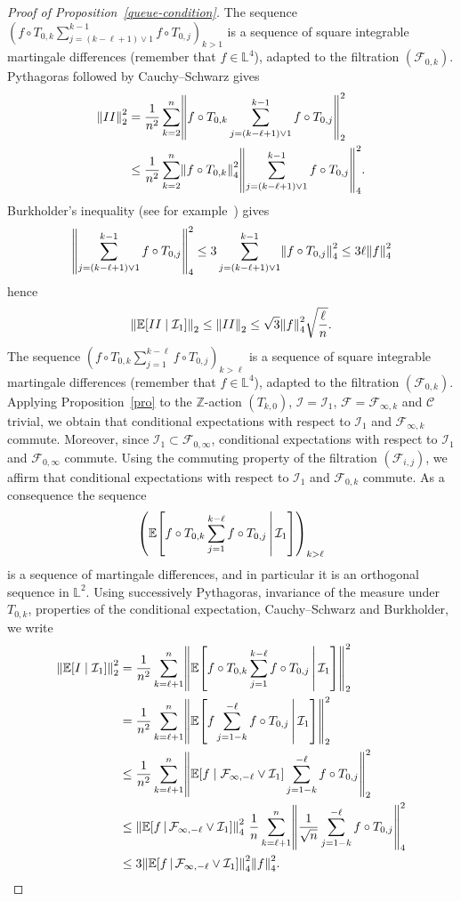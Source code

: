 \documentclass[AHL,Unicode,longabstracts,published]{cedram}
\newcommand{\Z}{\mathbb{Z}}
\newcommand*\bbL{\mathbb{L}}
\newcommand{\bbE}{\mathbb{E}}
\newcommand{\E}[1]{\bbE\left[#1\right]}
\newcommand*\I{\mathcal{I}}
\newcommand*\C{\mathcal{C}}
\newcommand*\F{\mathcal{F}}
\newcommand{\norm}[1]{\left\lVert #1\right\rVert}
\let\originalleft\left
\let\originalright\right
\renewcommand{\left}{\mathopen{}\mathclose\bgroup\originalleft}
\renewcommand{\right}{\aftergroup\egroup\originalright}
\begin{document}
\begin{proof}[Proof of Proposition~\ref{queue-condition}]
The sequence $(f \circ T_{0,k} \sum_{j=(k-\ell+1)\vee 1}^{k-1} f\circ T_{0,j})_{k>1}$ is a sequence of square integrable martingale differences (remember that $f\in \bbL^4$), adapted to the filtration $(\F_{0,k})$. Pythagoras followed by Cauchy--Schwarz gives
\begin{align*}
\norm{II}_2^2&= \frac1{n^2} \sum_{k=2}^{n} \norm{ f \circ T_{0,k}
\sum_{j=(k-\ell+1)\vee 1}^{k-1} f \circ T_{0,j}}_2^2\\
&\leq \frac1{n^2} \sum_{k=2}^{n}
\norm{f\circ T_{0,k}}_4^2\norm{\sum_{j=(k-\ell+1)\vee 1}^{k-1} f \circ T_{0,j}}_4^2.
\end{align*}
Burkholder's inequality (see for example~\cite{MR2472010}) gives
\[
\norm{\sum_{j=(k-\ell+1)\vee 1}^{k-1} f \circ T_{0,j}}_4^2\leq3\sum_{j=(k-\ell+1)\vee 1}^{k-1}\norm{f\circ T_{0,j}}_4^2\leq 3\ell\norm{f}_4^2
\]
hence
\begin{equation}\label{eq:controle_norme_II}
\norm{\E{II\mid\I_1}}_2\leq\norm{II}_2\leq \sqrt{3}\norm{f}_4^2\sqrt{\frac{\ell}{n}}.
\end{equation}
The sequence $(f \circ T_{0,k}
\sum_{j=1}^{k-\ell} f \circ T_{0,j})_{k>\ell}$ is a sequence of square integrable martingale differences (remember that $f\in \bbL^4$), adapted to the filtration $(\F_{0,k})$. Applying Proposition~\ref{pro} to the $\Z$-action $(T_{k,0})$, $\I=\I_1$, $\F=\F_{\infty,k}$ and $\C$ trivial, we obtain that conditional expectations with respect to $\I_1$ and $\F_{\infty,k}$ commute. Moreover, since $\I_1\subset\F_{0,\infty}$, conditional expectations with respect to $\I_1$ and $\F_{0,\infty}$ commute. Using the commuting property of the filtration $(\F_{i,j})$, we affirm that conditional expectations with respect to $\I_1$ and $\F_{0,k}$ commute. As a consequence the sequence
\[
\left(\E{f \circ T_{0,k}
\sum_{j=1}^{k-\ell} f \circ T_{0,j}\,\middle|\,\I_1}\right)_{k>\ell}
\]
is a sequence of martingale differences, and in particular it is an orthogonal sequence in $ \bbL^2$. Using successively Pythagoras, invariance of the measure under $T_{0,k}$, properties of the conditional expectation, Cauchy--Schwarz and Burkholder, we write
\begin{align*}
\norm{\E{I\mid\I_1}}_2^2&= \frac1{n^2} \sum_{k=\ell+1}^{n}
\norm{\E{f \circ T_{0,k} \sum_{j=1}^{k-\ell} f \circ T_{0,j}
\,\middle|\,\I_1}}_2^2\\
&=\frac1{n^2} \sum_{k=\ell+1}^{n}
\norm{\E{f \sum_{j=1-k}^{-\ell} f \circ T_{0,j}
\,\middle|\,\I_1}}_2^2\\
&\leq\frac1{n^2} \sum_{k=\ell+1}^{n}
\norm{\E{f\mid\F_{\infty,-\ell}\vee\I_1} \sum_{j=1-k}^{-\ell} f \circ T_{0,j} }_2^2\\
&\leq\norm{\E{f \,\middle|\,\F_{\infty,-\ell}\vee\I_1}}_4^2 \ \frac1n\sum_{k=\ell+1}^n\norm{\frac1{\sqrt n}\sum_{j=1-k}^{-\ell} f \circ T_{0,j}}_4^2\\
&\leq 3\norm{\E{f \,\middle|\,\F_{\infty,-\ell}\vee\I_1}}_4^2\norm{f}_4^2.
\end{align*}


\end{proof}
\end{document}
